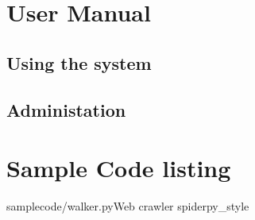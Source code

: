 \appendix
\chapter{User Manual}
\section{Using the system}
\section{Administation}

\chapter{Sample Code listing}
	\begin{codesnippet}{samplecode/walker.py}{Web crawler spider}{py_style}
	\end{codesnippet}
